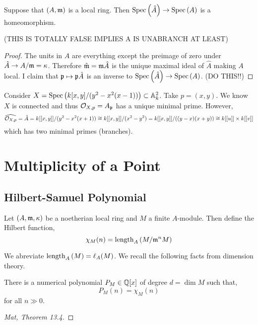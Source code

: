\documentclass[12pt]{article}
\begin{document}
\begin{lemma}
Suppose that $(A, \mathfrak{m})$ is a local ring. Then $\mathrm{Spec}\left( \hat{A} \right) \to \mathrm{Spec}\left( A \right)$ is a homeomorphism.
\end{lemma}

(THIS IS TOTALLY FALSE IMPLIES A IS UNABRANCH AT LEAST)

\begin{proof}
The units in $\hat{A}$ are everything except the preimage of zero under $\hat{A} \to A / \mathfrak{m} = \kappa$. Therefore $\hat{\mathfrak{m}} = \mathfrak{m} \hat{A}$ is the unique maximal ideal of $\hat{A}$ making $A$ local. I claim that $\mathfrak{p} \mapsto \mathfrak{p} \hat{A}$ is an inverse to $\mathrm{Spec}\left( \hat{A} \right) \to \mathrm{Spec}\left( A \right)$. (DO THIS!!)
\end{proof}

\begin{example}
Consider $X = \mathrm{Spec}\left( k[x, y]/(y^2 - x^2(x-1)) \right) \subset \mathbb{A}^2_k$. Take $p = (x, y)$. We know $X$ is connected and thus $\mathcal{O}_{X, p} = A_{\mathfrak{p}}$ has a unique minimal prime. However, 
\[ \widehat{\mathcal{O}_{X, p}} = \hat{A} = k[[x, y]] / (y^2 - x^2(x + 1)) \cong k[[x, y]]/(x^2 - y^2) = k[[x, y]]/((y - x)(x + y)) \cong k[[u]] \times k[[v]] \]
which has two minimal primes (branches). 
\end{example}


\section{Multiplicity of a Point}

\subsection{Hilbert-Samuel Polynomial}

\begin{defn}
Let $(A, \mathfrak{m}, \kappa)$ be a noetherian local ring and $M$ a finite $A$-module. Then define the Hilbert function,
\[ \chi_M(n) = \mathrm{length}_{A}\left( M/\mathfrak{m}^n M \right) \]
\end{defn}

\begin{rmk}
We abreviate $\mathrm{length}_{A}\left( M \right) = \ell_A(M)$. We recall the following facts from dimension theory.
\end{rmk}

\begin{prop}
There is a numerical polynomial $P_M \in \mathbb{Q}[x]$ of degree $d = \dim{M}$ such that,
\[ P_M(n) = \chi_M(n) \]
for all $n \gg 0$.
\end{prop}

\begin{proof}
[Mat, Theorem 13.4]
\end{proof}
\end{document}
